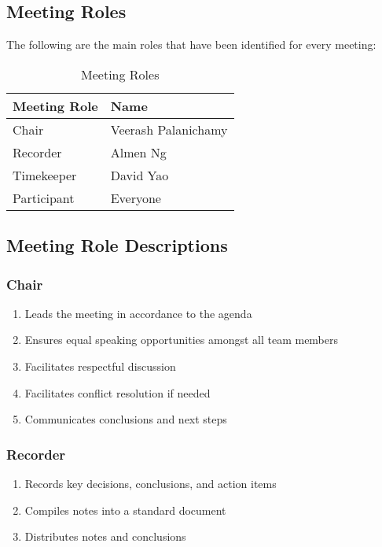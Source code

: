 \documentclass[12pt,letterpaper]{article}
\begin{document}
\newpage

\subsection{Meeting Roles}
The following are the main roles that have been identified for every meeting:

\begin{table}[hbt!]
    \centering
    \begin{tabularx}{\textwidth}{|X|X|}
        \toprule
        \textbf{Meeting Role} & \textbf{Name}\\
        \midrule
        Chair       & Veerash Palanichamy\\
        Recorder    & Almen Ng\\
        Timekeeper  & David Yao\\
        Participant & Everyone\\
        \bottomrule
    \end{tabularx}
\caption{Meeting Roles} \label{tab:meetingRoles}
\end{table}

\subsection{Meeting Role Descriptions}
\subsubsection{Chair}
\begin{enumerate}
    \item Leads the meeting in accordance to the agenda 
    \item Ensures equal speaking opportunities amongst all team members 
    \item Facilitates respectful discussion
    \item Facilitates conflict resolution if needed 
    \item Communicates conclusions and next steps 
\end{enumerate}

\subsubsection{Recorder}
\begin{enumerate}
    \item Records key decisions, conclusions, and action items
    \item Compiles notes into a standard document
    \item Distributes notes and conclusions
\end{enumerate}
\end{document}
